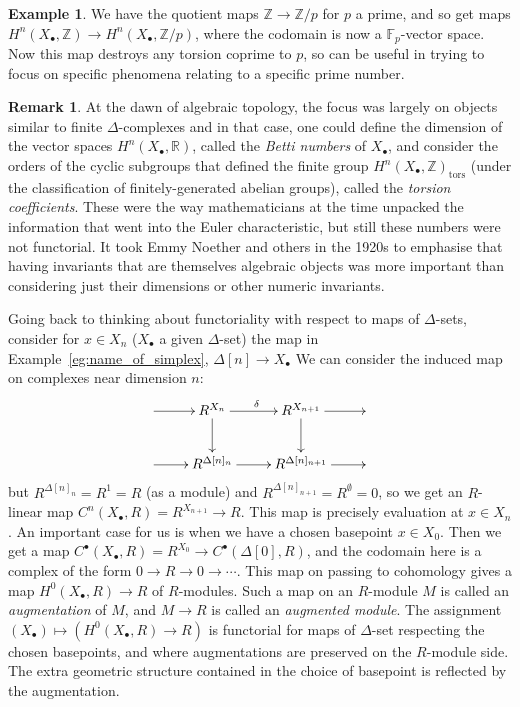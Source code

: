 \documentclass{tufte-handout}
\def\RR{\mathbb{R}}
\def\ZZ{\mathbb{Z}}
\newcommand{\lecturenum}[1]{\marginnote{\color{red}Lecture #1}}
\theoremstyle{definition}
\newtheorem{example}{Example}
\newtheorem*{rem}{Remark}
\begin{document}
\begin{example}
We have the quotient maps $\ZZ\to \ZZ/p$ for $p$ a prime, and so get maps
$H^n(X_\bullet,\ZZ) \to H^n(X_\bullet,\ZZ/p)$, where the codomain is now a $\mathbb{F}_p$-vector
space. Now this map destroys any torsion coprime to $p$, so can be useful in trying to focus
on specific phenomena relating to a specific prime number.
\end{example}

\begin{rem}
At the dawn of algebraic topology, the focus was largely on objects similar to finite $\Delta$-complexes
and in that case, one could define the dimension of the vector spaces $H^n(X_\bullet,\RR)$, 
called the \emph{Betti numbers} of $X_\bullet$,
and consider the orders of the cyclic subgroups that defined the finite group 
$H^n(X_\bullet,\ZZ)_\mathrm{tors}$ (under the classification of finitely-generated abelian
groups), called the \emph{torsion coefficients}. These were the way mathematicians at the time
unpacked the information that went into the Euler characteristic, but still these numbers 
were not functorial. It took Emmy Noether and others in the 1920s to emphasise that having 
invariants that are themselves algebraic objects was more important than considering just 
their dimensions or other numeric invariants.
\end{rem}

Going\lecturenum{23} back to thinking about functoriality with respect to maps of 
$\Delta$-sets, consider for $x\in X_n$ ($X_\bullet$ a given $\Delta$-set) the map in 
Example~\ref{eg:name_of_simplex}, $\Delta[n] \to X_\bullet$ We can consider the induced map
on complexes near dimension $n$:
\[
	\xymatrix{
	\ar[r] & R^{X_n} \ar[d] \ar[r]^\delta & R^{X_{n+1}} \ar[r] \ar[d] & \\
	\ar[r] & R^{\Delta[n]_n} \ar[r] & R^{\Delta[n]_{n+1}} \ar[r] &
	}
\]
but $R^{\Delta[n]_n} = R^1 = R$ (as a module) and $R^{\Delta[n]_{n+1}} = R^\emptyset=0$, so we
get an $R$-linear map $C^n(X_\bullet,R) = R^{X_{n+1}} \to R$. This map is precisely 
evaluation at $x\in X_n$.
An important case for us is when we have a chosen basepoint $x\in X_0$. Then
we get a map $C^\bullet(X_\bullet,R)=R^{X_0} \to C^\bullet(\Delta[0],R)$, and the codomain
here is a complex of the form $0\to R \to 0\to \cdots$. This map on passing to 
cohomology gives a map $H^0(X_\bullet,R) \to R$ of $R$-modules. Such a map on an $R$-module $M$
is called an \emph{augmentation} of $M$, and $M\to R$ is called an \emph{augmented module}.
The assignment $(X_\bullet) \mapsto (H^0(X_\bullet,R) \to R)$ is functorial for maps of $\Delta$-set
respecting the chosen basepoints, and where augmentations are preserved on the $R$-module side.
The extra geometric structure contained in the choice of basepoint is reflected by the augmentation.
\end{document}
